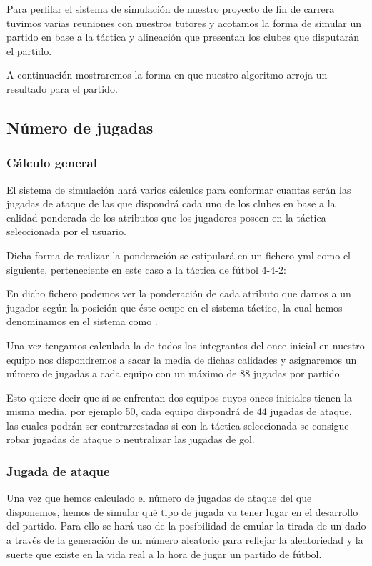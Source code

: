 Para perfilar el sistema de simulación de nuestro proyecto de fin de carrera
tuvimos varias reuniones con nuestros tutores y acotamos la forma de simular un
partido en base a la táctica y alineación que presentan los clubes que
disputarán el partido.

A continuación mostraremos la forma en que nuestro algoritmo arroja un resultado
para el partido.

\subsection{Número de jugadas}
\subsubsection{Cálculo general}
El sistema de simulación hará varios cálculos para conformar cuantas serán las
jugadas de ataque de las que dispondrá cada uno de los clubes en base a la
calidad ponderada de los atributos que los jugadores poseen en la táctica
seleccionada por el usuario.

Dicha forma de realizar la ponderación se estipulará en un fichero yml como el
siguiente, perteneciente en este caso a la táctica de fútbol 4-4-2:



En dicho fichero podemos ver la ponderación de cada atributo que damos a un jugador según la
posición que éste ocupe en el sistema táctico, la cual hemos denominamos en el sistema
como .

Una vez tengamos calculada la  de todos los integrantes
del once inicial en nuestro equipo nos dispondremos a sacar la media de dichas
calidades y asignaremos un número de jugadas a cada equipo con un máximo de 88
jugadas por partido.

Esto quiere decir que si se enfrentan dos equipos cuyos onces iniciales tienen
la misma media, por ejemplo 50, cada equipo dispondrá de 44 jugadas de ataque,
las cuales podrán ser contrarrestadas si con la táctica seleccionada se consigue
robar jugadas de ataque o neutralizar las jugadas de gol.

\subsubsection{Jugada de ataque}
Una vez que hemos calculado el número de jugadas de ataque del que disponemos,
hemos de simular qué tipo de jugada va tener lugar en el desarrollo del
partido. Para ello se hará uso de la posibilidad de emular la tirada de un dado
a través de la generación de un número aleatorio para reflejar la aleatoriedad
y la suerte que existe en la vida real a la hora de jugar un partido de fútbol.

